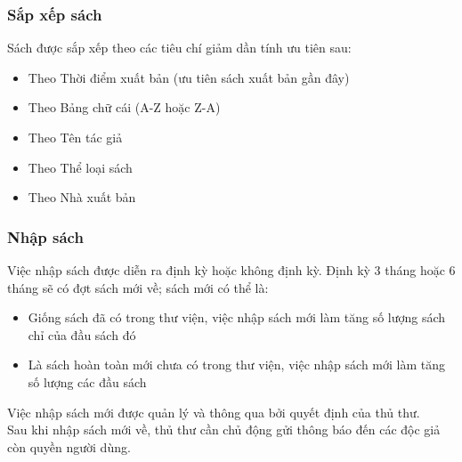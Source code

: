 \documentclass[12pt,a4paper]{report}
\begin{document}
            \subsubsection{Sắp xếp sách}
            Sách được sắp xếp theo các tiêu chí giảm dần tính ưu tiên sau:
            \begin{itemize}
                \item Theo Thời điểm xuất bản (ưu tiên sách xuất bản gần đây)
                \item Theo Bảng chữ cái (A-Z hoặc Z-A)
                \item Theo Tên tác giả
                \item Theo Thể loại sách
                \item Theo Nhà xuất bản
            \end{itemize}

            \subsubsection{Nhập sách}
            Việc nhập sách được diễn ra định kỳ hoặc không định kỳ. Định kỳ 3 tháng hoặc 6 tháng sẽ có đợt sách mới về; sách mới có thể là:
            \begin{itemize}
                \item Giống sách đã có trong thư viện, việc nhập sách mới làm tăng số lượng sách chỉ của đầu sách đó
                \item Là sách hoàn toàn mới chưa có trong thư viện, việc nhập sách mới làm tăng số lượng các đầu sách
            \end{itemize}
            Việc nhập sách mới được quản lý và thông qua bởi quyết định của thủ thư.\\
            Sau khi nhập sách mới về, thủ thư cần chủ động gửi thông báo đến các độc giả còn quyền người dùng.\\
\end{document}
